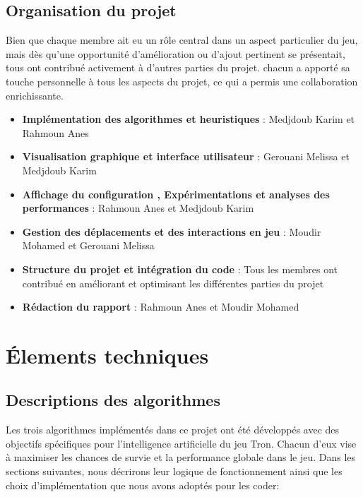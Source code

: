 \documentclass[a4paper,12pt]{article}
\begin{document}
\subsection{Organisation du projet}

Bien que chaque membre ait eu un rôle central dans un aspect particulier du jeu, mais dès qu'une opportunité d'amélioration ou d'ajout pertinent se présentait, tous ont contribué activement à d'autres parties du projet. chacun a apporté sa touche personnelle à tous les aspects du projet, ce qui a permis une collaboration enrichissante.

\begin{itemize}
\item \textbf{Implémentation des algorithmes et heuristiques} : Medjdoub Karim et Rahmoun Anes
\item \textbf{Visualisation graphique et interface utilisateur} : Gerouani Melissa et Medjdoub Karim
\item \textbf{Affichage du configuration , Expérimentations et analyses des performances} : Rahmoun Anes et Medjdoub Karim
\item \textbf{Gestion des déplacements et des interactions en jeu} : Moudir Mohamed et Gerouani Melissa
\item \textbf{Structure du projet et intégration du code} : Tous les membres ont contribué en améliorant et optimisant les différentes parties du projet
\item \textbf{Rédaction du rapport} : Rahmoun Anes et Moudir Mohamed
\end{itemize}


\section{Élements techniques}
\subsection{Descriptions des algorithmes}
Les trois algorithmes implémentés dans ce projet ont été développés avec des objectifs spécifiques pour l'intelligence artificielle du jeu Tron. Chacun d'eux vise à maximiser les chances de survie et la performance globale dans le jeu. Dans les sections suivantes, nous décrirons leur logique de fonctionnement ainsi que les choix d'implémentation que nous avons adoptés pour les coder:
\end{document}

